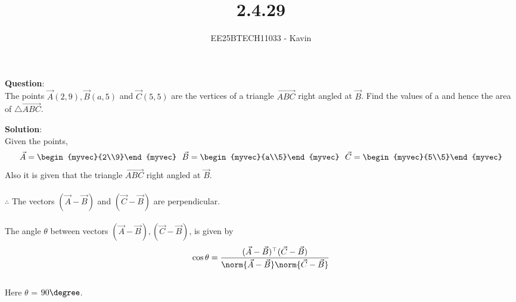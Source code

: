 \documentclass[journal]{IEEEtran}
\begin{document}

\vspace{3cm}

\title{2.4.29}
\author{EE25BTECH11033 - Kavin}
{\let\newpage\relax\maketitle}

\renewcommand{\thefigure}{\theenumi}
\renewcommand{\thetable}{\theenumi}
\setlength{\intextsep}{10pt} %
\textbf{Question}:\\
The points $\vec{A}(2, 9), \vec{B}(a, 5) $ and $\vec{C}(5, 5)$ are the vertices of a triangle $\vec{ABC}$ right angled at $\vec{B}$. Find the values of a and hence the area of $\triangle \vec{ABC}$.\\
\bigskip

\textbf{Solution}:\\
Given the points,
\begin{align}
    \vec{A}=\begin{myvec}{2\\9}\end{myvec}\ \ 
    \vec{B}=\begin{myvec}{a\\5}\end{myvec}\ \ 
    \vec{C}=\begin{myvec}{5\\5}\end{myvec}
\end{align}
Also it is given that the triangle $\vec{ABC}$ right angled at $\vec{B}$.\\
\\
$\therefore$ The vectors $(\vec{A}-\vec{B})$ and $(\vec{C}-\vec{B})$ are perpendicular.\\
\\
The angle $\theta$ between vectors $(\vec{A}-\vec{B}), (\vec{C}-\vec{B})$, is given by 
\begin{align}
	\label{eq:angle-inner}
		\cos\theta=\frac{{(\vec{A}-\vec{B})^{\top}}{(\vec{C}-\vec{B})}}{\norm{\vec{A}-\vec{B}}\norm{\vec{C}-\vec{B}}}
\end{align}
\bigskip
\\
Here $\theta$ = $90\degree$.
\end{document}
